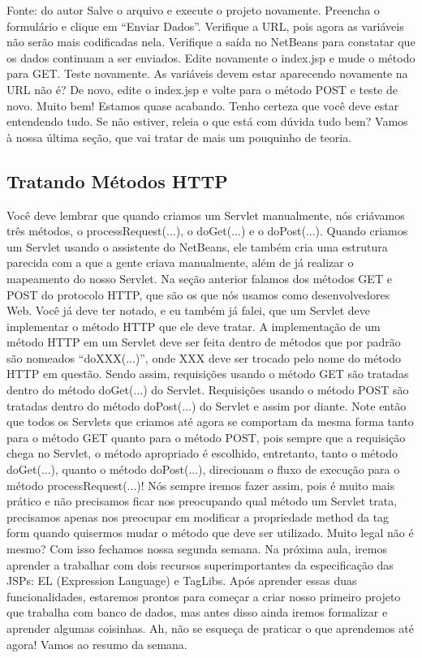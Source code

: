 Fonte: do autor
Salve o arquivo e execute o projeto novamente. Preencha o formulário e clique em “Enviar Dados”. Verifique a URL, pois agora as variáveis não serão mais codificadas nela. Verifique a saída no NetBeans para constatar que os dados continuam a ser enviados. Edite novamente o index.jsp e mude o método para GET. Teste novamente. As variáveis devem estar aparecendo novamente na URL não é? De novo, edite o index.jsp e volte para o método POST e teste de novo.
Muito bem! Estamos quase acabando. Tenho certeza que você deve estar entendendo tudo. Se não estiver, releia o que está com dúvida tudo bem? Vamos à nossa última seção, que vai tratar de mais um pouquinho de teoria.



\subsection{Tratando Métodos HTTP}

Você deve lembrar que quando criamos um Servlet manualmente, nós criávamos três métodos, o processRequest(...), o doGet(...) e o doPost(...). Quando criamos um Servlet usando o assistente do NetBeans, ele também cria uma estrutura parecida com a que a gente criava manualmente, além de já realizar o mapeamento do nosso Servlet. Na seção anterior falamos dos métodos GET e POST do protocolo HTTP, que são os que nós usamos como desenvolvedores Web. Você já deve ter notado, e eu também já falei, que um Servlet deve implementar o método HTTP que ele deve tratar. A implementação de um método HTTP em um Servlet deve ser feita dentro de métodos que por padrão são nomeados “doXXX(...)”, onde XXX deve ser trocado pelo nome do método HTTP em questão. Sendo assim, requisições usando o método GET são tratadas dentro do método doGet(...) do Servlet. Requisições usando o método POST são tratadas dentro do método doPost(...) do Servlet e assim por diante.
Note então que todos os Servlets que criamos até agora se comportam da mesma forma tanto para o método GET quanto para o método POST, pois sempre que a requisição chega no Servlet, o método apropriado é escolhido, entretanto, tanto o método doGet(...), quanto o método doPost(...), direcionam o fluxo de execução para o método processRequest(...)! Nós sempre iremos fazer assim, pois é muito mais prático e não precisamos ficar nos preocupando qual método um Servlet trata, precisamos apenas nos preocupar em modificar a propriedade method da tag form quando quisermos mudar o método que deve ser utilizado. 
Muito legal não é mesmo? Com isso fechamos nossa segunda semana. Na próxima aula, iremos aprender a trabalhar com dois recursos superimportantes da especificação das JSPs: EL (Expression Language) e TagLibs. Após aprender essas duas funcionalidades, estaremos prontos para começar a criar nosso primeiro projeto que trabalha com banco de dados, mas antes disso ainda iremos formalizar e aprender algumas coisinhas. Ah, não se esqueça de praticar o que aprendemos até agora! Vamos ao resumo da semana.



